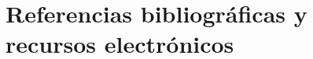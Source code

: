 \chapter{Referencias bibliográficas y recursos electrónicos}

\printbibliography[heading=subbibliography]

